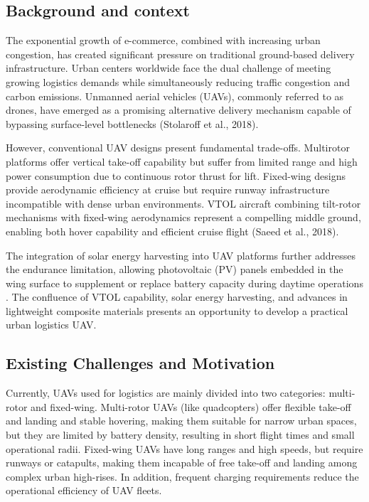 \documentclass[conference]{IEEEtran}
\begin{document}
\subsection{Background and context}
The exponential growth of e-commerce, combined with increasing urban congestion, has created significant pressure on traditional ground-based delivery infrastructure. Urban centers worldwide face the dual challenge of meeting growing logistics demands while simultaneously reducing traffic congestion and carbon emissions. Unmanned aerial vehicles (UAVs), commonly referred to as drones, have emerged as a promising alternative delivery mechanism capable of bypassing surface-level bottlenecks (Stolaroff et al., 2018)\cite{b6}.

However, conventional UAV designs present fundamental trade-offs. Multirotor platforms offer vertical take-off capability but suffer from limited range and high power consumption due to continuous rotor thrust for lift. Fixed-wing designs provide aerodynamic efficiency at cruise but require runway infrastructure incompatible with dense urban environments. VTOL aircraft combining tilt-rotor mechanisms with fixed-wing aerodynamics represent a compelling middle ground, enabling both hover capability and efficient cruise flight (Saeed et al., 2018)\cite{b5}.

The integration of solar energy harvesting into UAV platforms further addresses the endurance limitation, allowing photovoltaic (PV) panels embedded in the wing surface to supplement or replace battery capacity during daytime operations \cite{b9}. The confluence of VTOL capability, solar energy harvesting, and advances in lightweight composite materials presents an opportunity to develop a practical urban logistics UAV.

\subsection{Existing Challenges and Motivation}
Currently, UAVs used for logistics are mainly divided into two categories: multi-rotor and fixed-wing. Multi-rotor UAVs (like quadcopters) offer flexible take-off and landing and stable hovering, making them suitable for narrow urban spaces, but they are limited by battery density, resulting in short flight times and small operational radii. Fixed-wing UAVs have long ranges and high speeds, but require runways or catapults, making them incapable of free take-off and landing among complex urban high-rises. In addition, frequent charging requirements reduce the operational efficiency of UAV fleets.
\end{document}
